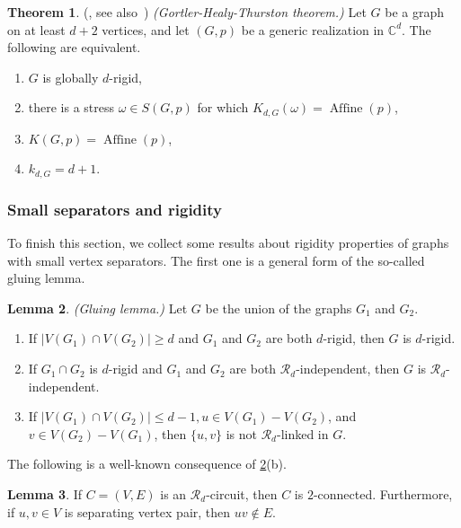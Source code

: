 \documentclass[11pt,a4paper,dvipsnames]{scrartcl}
\theoremstyle{definition}
\newtheorem{theorem}{Theorem}[section]
\newtheorem{lemma}[theorem]{Lemma}
\newcommand{\CC}{\mathbb{C}}
\newcommand{\stressnullity}[1]{k_{d, #1}}
\newcommand{\globrig}[1]{globally $#1$-rigid}
\newcommand{\rig}[1]{$#1$-rigid}
\newcommand{\stresskernel}[2]{K_{{#1},{#2}}}
\newcommand{\sharedstresskernel}[1]{K}
\DeclareMathOperator{\aff}{Affine}
\newcommand{\affine}[2]{\aff(#2)}
\begin{document}
\begin{theorem}\label{theorem:ght} (\cite{gortler.etal_2010}, see also~\cite[Theorem 1]{gortler.thurston_2014a}) \emph{(Gortler-Healy-Thurston theorem.)}\newline
    Let $G$ be a graph on at least $d+2$ vertices, and let $(G,p)$ be a generic realization in $\CC^d$. The following are equivalent.
    \begin{enumerate}
        \item $G$ is \globrig{d},
        \item there is a stress $\omega \in S(G,p)$ for which $\stresskernel{d}{G}(\omega) = \affine{G}{p}$,
        \item $\sharedstresskernel{d}(G,p) = \affine{G}{p}$,
        \item $\stressnullity{G} = d+1$.
    \end{enumerate}
\end{theorem}


\subsubsection{Small separators and rigidity}
To finish this section, we collect some results about rigidity properties of graphs with small vertex separators.
The first one is a general form of the so-called gluing lemma.
\begin{lemma}\label{lemma:whiteleygluing}\cite[Lemma 11.1.9]{whlong} \emph{(Gluing lemma.)}\newline
    Let $G$ be the union of the graphs $G_1$ and $G_2$.
    \begin{enumerate}
        \item If $|V(G_1) \cap V(G_2)| \geq d$ and $G_1$ and $G_2$ are both \rig{d}, then $G$ is \rig{d}.
        \item If $G_1 \cap G_2$ is \rig{d} and $G_1$ and $G_2$ are both $\mathcal{R}_d$-independent, then $G$ is $\mathcal{R}_d$-independent.
        \item If $|V(G_1) \cap V(G_2)| \leq d-1, u \in V(G_1) - V(G_2)$, and $v \in V(G_2) - V(G_1)$, then $\{u,v\}$ is not $\mathcal{R}_d$-linked in $G$.
    \end{enumerate}
\end{lemma}
The following is a well-known consequence of \cref{lemma:whiteleygluing}(b).

\begin{lemma}\label{lemma:circuitseparatingpair}
    If $C = (V,E)$ is an $\mathcal{R}_d$-circuit, then $C$ is $2$-connected. Furthermore, if $u,v \in V$ is separating vertex pair, then $uv \notin E$.
\end{lemma}
\end{document}
